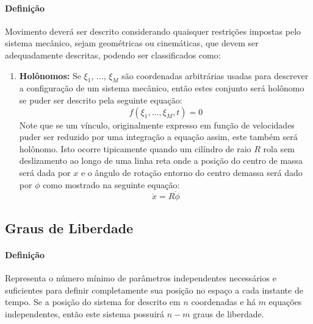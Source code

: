 \documentclass{article}
\begin{document}
            \paragraph{Definição}Movimento deverá ser descrito considerando quaisquer restrições impostas pelo sistema mecânico, sejam geométricas ou cinemáticas, que devem ser adequadamente descritas, podendo ser classificados como:
                \begin{enumerate}[rightmargin = \leftmargin]
                    \item \textbf{Holônomos:} Se $\xi_{1}$, ..., $\xi_{M}$ são coordenadas arbitrárias usadas para descrever a configuração de um sistema mecânico, então estes conjunto será holônomo se puder ser descrito pela seguinte equação:
                        \begin{equation}
                            \boxed{
                                f(\xi_{1}, ..., \xi_{M}, t) = 0
                            }
                        \end{equation}
                    Note que se um vínculo, originalmente expresso em função de velocidades puder ser reduzido por uma integração a equação assim, este também será holônomo. Isto ocorre tipicamente quando um cilíndro de raio $R$ rola sem deslizamento ao longo de uma linha reta onde a posição do centro de massa será dada por $x$ e o ângulo de rotação entorno do centro demassa será dado por $\phi$ como mostrado na seguinte equação:
                        \begin{equation}
                            \boxed{
                                \dot{x} = R \dot{\phi}
                            }
                        \end{equation}
                \end{enumerate}

        \subsection{Graus de Liberdade}
            \paragraph{Definição}Representa o número mínimo de parâmetros independentes necessários e suficientes para definir completamente sua posição no espaço a cada instante de tempo. Se a posição do sistema for descrito em $n$ coordenadas e há $m$ equações independentes, então este sistema possuirá $n-m$ graus de liberdade.
\end{document}
